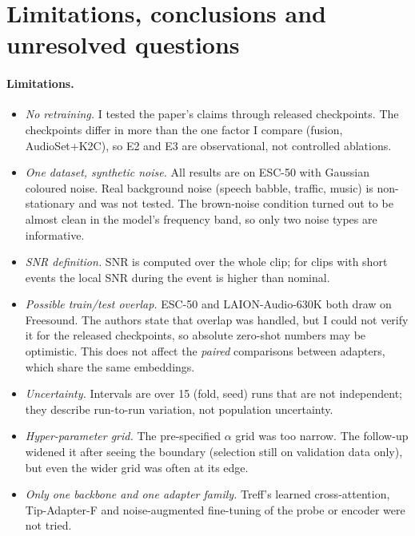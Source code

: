 \section{Limitations, conclusions and unresolved questions}
\label{sec:limits}

\paragraph{Limitations.}
\begin{itemize}\itemsep0pt
\item \emph{No retraining.} I tested the paper's claims through released checkpoints. The checkpoints differ in more than the one factor I compare (fusion, AudioSet+K2C), so E2 and E3 are observational, not controlled ablations.
\item \emph{One dataset, synthetic noise.} All results are on ESC-50 with Gaussian coloured noise. Real background noise (speech babble, traffic, music) is non-stationary and was not tested. The brown-noise condition turned out to be almost clean in the model's frequency band, so only two noise types are informative.
\item \emph{SNR definition.} SNR is computed over the whole clip; for clips with short events the local SNR during the event is higher than nominal.
\item \emph{Possible train/test overlap.} ESC-50 and LAION-Audio-630K both draw on Freesound. The authors state that overlap was handled, but I could not verify it for the released checkpoints, so absolute zero-shot numbers may be optimistic. This does not affect the \emph{paired} comparisons between adapters, which share the same embeddings.
\item \emph{Uncertainty.} Intervals are over 15 (fold, seed) runs that are not independent; they describe run-to-run variation, not population uncertainty.
\item \emph{Hyper-parameter grid.} The pre-specified $\alpha$ grid was too narrow. The follow-up widened it after seeing the boundary (selection still on validation data only), but even the wider grid was often at its edge.
\item \emph{Only one backbone and one adapter family.} Treff's learned cross-attention, Tip-Adapter-F and noise-augmented fine-tuning of the probe or encoder were not tried.
\end{itemize}

